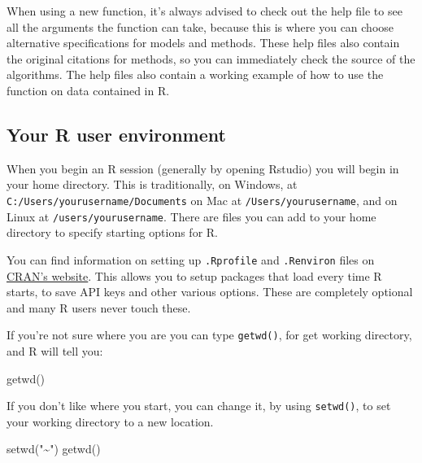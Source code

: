 \documentclass[
]{article}
\newenvironment{Shaded}{\begin{snugshade}}{\end{snugshade}}
\newcommand{\FunctionTok}[1]{\textcolor[rgb]{0.00,0.00,0.00}{#1}}
\newcommand{\NormalTok}[1]{#1}
\newcommand{\StringTok}[1]{\textcolor[rgb]{0.31,0.60,0.02}{#1}}
\begin{document}
When using a new function, it's always advised to check out the help
file to see all the arguments the function can take, because this is
where you can choose alternative specifications for models and methods.
These help files also contain the original citations for methods, so you
can immediately check the source of the algorithms. The help files also
contain a working example of how to use the function on data contained
in R.

\hypertarget{your-r-user-environment}{%
\subsection{Your R user environment}\label{your-r-user-environment}}

When you begin an R session (generally by opening Rstudio) you will
begin in your home directory. This is traditionally, on Windows, at
\texttt{\textquotesingle{}C:/Users/yourusername/Documents\textquotesingle{}} on Mac at \texttt{\textquotesingle{}/Users/yourusername\textquotesingle{}},
and on Linux at \texttt{\textquotesingle{}/users/yourusername\textquotesingle{}}. There are files you can add to
your home directory to specify starting options for R.

You can find information on setting up \texttt{.Rprofile} and \texttt{.Renviron} files
on \href{https://cran.r-project.org/web/packages/startup/vignettes/startup-intro.html}{CRAN's
website}.
This allows you to setup packages that load every time R starts, to save
API keys and other various options. These are completely optional and
many R users never touch these.

If you're not sure where you are you can type \texttt{getwd()}, for get working
directory, and R will tell you:

\begin{Shaded}
\begin{Highlighting}[]
\FunctionTok{getwd}\NormalTok{()}
\end{Highlighting}
\end{Shaded}

If you don't like where you start, you can change it, by using
\texttt{setwd()}, to set your working directory to a new location.

\begin{Shaded}
\begin{Highlighting}[]
\FunctionTok{setwd}\NormalTok{(}\StringTok{"\textasciitilde{}"}\NormalTok{)}
\FunctionTok{getwd}\NormalTok{()}
\end{Highlighting}
\end{Shaded}
\end{document}
